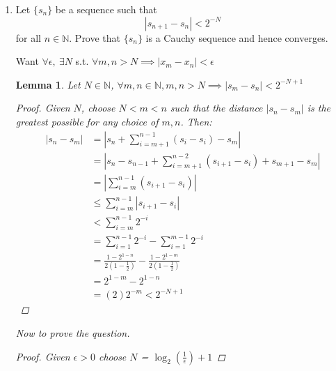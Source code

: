 \documentclass{article}
\newtheorem*{lemma}{Lemma}
\begin{document}
\begin{enumerate}
\begin{enumerate}
\begin{proof}
        Bounded: WTP: $0 < a_{k} \leq 1, \: \forall k$ Base $a_0 = 1 \in (0,1]$

        Induction $:$ Suppose $0 < a_n \leq 1, n \in \mathbb{N} $

        \begin{align*}
            0 &< a_n \leq 1 \\
            0 &< \Big(1 - \frac{1}{4n^2} \Big)a_n \leq \Big(1 - \frac{1}{4n^2} \Big) \\
            0 &<a_{n+1} \leq \Big(1 - \frac{1}{4n^2} \Big) < 1 \\
            0 &<a_{n+1}  < 1
        \end{align*}
        
        Since the sequence is monotone and bounded, it converges.

        \end{proof}
        \item What do you think that lim $a_n$ is?

        $\approx 0.6$ from empirical testing.
    \end{enumerate}

    \item Let $\{s_n\}$ be a sequence such that
   \[|s_{n+1} - s_n| < 2^{-N}\] 
   for all $n \in \mathbb{N}$. Prove that $\{ s_n \}$ is a Cauchy sequence and hence converges.
    
    Want $\forall \epsilon ,\: \exists N$ s.t. $\forall m,n > N \implies |x_m - x_n| < \epsilon$
    
    \begin{lemma}
        Let $N \in \mathbb{N}$, $\forall m, n \in \mathbb{N}, m,n > N\implies |s_m - s_n| < 2^{-N + 1}$
        \begin{proof}
            Given $N$, choose $N < m<n$ such that the distance $|s_n - s_m|$ is the greatest possible for any choice of $m,n$. Then:
            \begin{align*}
                |s_n - s_m| &= |s_n + \sum_{i = m + 1}^{n-1}(s_i - s_i) - s_m| \\
                &= |s_n - s_{n-1} + \sum_{i=m+1}^{n-2}(s_{i+1} - s_i) + s_{m+1} - s_m| \\
                &= |\sum_{i=m}^{n-1}(s_{i+1} - s_i)| \\
                &\leq \sum_{i=m}^{n-1}|s_{i+1} - s_i| \\
                 &< \sum_{i=m}^{n-1}2^{-i} \\
                &= \sum_{i=1}^{n-1}2^{-i} - \sum_{i=1}^{m-1}2^{-i} \\
                &= \frac{1-2^{1-n}}{2(1-\frac{1}{2})} - \frac{1-2^{1-m}}{2(1-\frac{1}{2})} \\
                &=  2^{1-m}-2^{1-n} \\
                &= (2)2^{-m} < 2^{-N + 1}
            \end{align*}
        \end{proof}
        Now to prove the question.
        \begin{proof}
            Given $\epsilon > 0$ choose $N$ = $\log_2(\frac{1}{\epsilon}) + 1$
            

\end{proof}
\end{lemma}
\end{enumerate}
\end{document}
